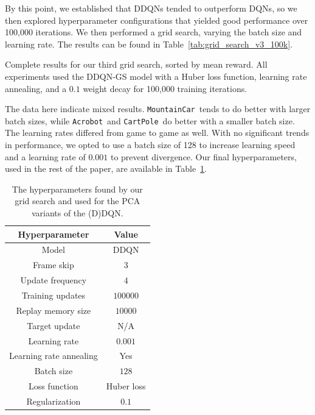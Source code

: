 \documentclass[11pt]{article}
\newcommand{\cp}{\texttt{CartPole}}
\newcommand{\ab}{\texttt{Acrobot}}
\newcommand{\mc}{\texttt{MountainCar}}
\begin{document}
By this point, we established that DDQNs tended to outperform DQNs, so we then explored hyperparameter configurations that yielded good performance over 100,000 iterations. We then performed a grid search, varying the batch size and learning rate. The results can be found in Table~\ref{tab:grid_search_v3_100k}.

\begin{table}[!ht]
    \footnotesize
    \centering
    
    
    \caption{Complete results for our third grid search, sorted by mean reward. All experiments used the DDQN-GS model with a Huber loss function, learning rate annealing, and a $0.1$ weight decay for 100,000 training iterations.}
    \label{tab:grid_search_v3_100k}
\end{table}

The data here indicate mixed results. \mc~tends to do better with larger batch sizes, while \ab~and \cp~do better with a smaller batch size. The learning rates differed from game to game as well. With no significant trends in performance, we opted to use a batch size of 128 to increase learning speed and a learning rate of $0.001$ to prevent divergence. Our final hyperparameters, used in the rest of the paper, are available in Table~\ref{tab:grid_search_hyperparameters}.

\begin{table}[!ht]
    \footnotesize
    \centering
    \begin{tabular}{c|c}
        \toprule
        Hyperparameter & Value \\ \midrule
        Model & DDQN \\
        Frame skip & $3$ \\
        Update frequency & $4$ \\
        Training updates & $100000$ \\
        Replay memory size & $10000$ \\
        Target update & N/A \\
        Learning rate & $0.001$ \\
        Learning rate annealing & Yes \\
        Batch size & $128$ \\
        Loss function & Huber loss \\
        Regularization & $0.1$ \\
        \bottomrule
    \end{tabular}
    \caption{The hyperparameters found by our grid search and used for the PCA variants of the (D)DQN.}
    \label{tab:grid_search_hyperparameters}
\end{table}
\end{document}
